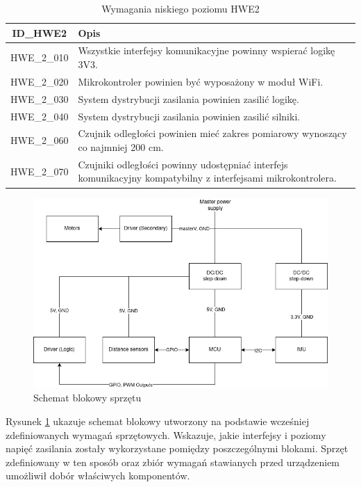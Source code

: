 \documentclass[12pt,twoside]{article}
\begin{document}
\begin{table}[ht]
\caption{Wymagania niskiego poziomu HWE2}
\centering
\begin{tabular}{|c|p{}|}	
    \hline
    ID\_HWE2 & Opis \\
    \hline
    HWE\_2\_010 & Wszystkie interfejsy komunikacyjne powinny wspierać logikę 3V3. \\
    \hline
    HWE\_2\_020 & Mikrokontroler powinien być wyposażony w moduł WiFi. \\
    \hline 
    HWE\_2\_030 & System dystrybucji zasilania powinien zasilić logikę.\\
    \hline
    HWE\_2\_040 & System dystrybucji zasilania powinien zasilić silniki. \\
    \hline
    HWE\_2\_060 & Czujnik odległości powinien mieć zakres pomiarowy wynoszący co najmniej 200 cm. \\
    \hline
    HWE\_2\_070 & Czujniki odległości powinny udostępniać interfejs komunikacyjny kompatybilny z interfejsami mikrokontrolera. \\
    \hline
\end{tabular}
\label{Tab:HWE2}
\end{table}
	

\begin{figure}[ht]%
 \centering%
 \includegraphics[width=12cm]{figures/engHW/robotblock.png}%
 \caption{Schemat blokowy sprzętu}%
 \label{Fig:schemat}%
\end{figure}

Rysunek \ref{Fig:schemat} ukazuje schemat blokowy utworzony na podstawie wcześniej zdefiniowanych wymagań sprzętowych. Wskazuje, jakie interfejsy i poziomy napięć zasilania zostały wykorzystane pomiędzy poszczególnymi blokami. Sprzęt zdefiniowany w ten sposób oraz zbiór wymagań stawianych przed urządzeniem umożliwił dobór właściwych komponentów.
\end{document}
